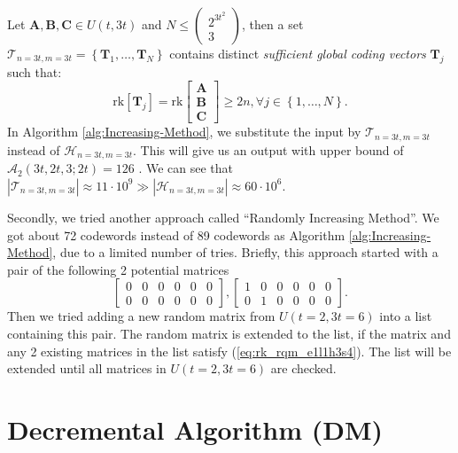 \begin{defn}
 Let $\boldsymbol{A},\boldsymbol{B},\boldsymbol{C}\in U(t,3t)$ and
$N\leq\left(\begin{array}{c}
2^{3t^{2}}\\
3
\end{array}\right)$, then a set $\mathcal{T}_{n=3t,m=3t}=\left\{ \boldsymbol{T}_{1},\ldots,\boldsymbol{T}_{N}\right\} $
contains distinct \textit{sufficient global coding vectors} $\boldsymbol{T}_{j}$
such that:
\[
\mathrm{rk}\left[\boldsymbol{T}_{j}\right]=\mathrm{rk}\left[\begin{array}{c}
\boldsymbol{A}\\
\boldsymbol{B}\\
\boldsymbol{C}
\end{array}\right]\geq2n,\forall j\in\left\{ 1,\ldots,N\right\} .
\]
In Algorithm \ref{alg:Increasing-Method}, we substitute the input
by $\mathcal{T}_{n=3t,m=3t}$ instead of $\mathcal{H}_{n=3t,m=3t}$.
This will give us an output with upper bound of $\mathcal{A}_{2}\left(3t,2t,3;2t\right)=126$
\cite[Sec. V-B]{Zhang:2019}. We can see that $\left|\mathcal{T}_{n=3t,m=3t}\right|\approx11\cdot10^{9}\gg\left|\mathcal{H}_{n=3t,m=3t}\right|\approx60\cdot10^{6}$.
\end{defn}
Secondly, we tried another approach called ``Randomly Increasing
Method''. We got about 72 codewords instead of 89 codewords as Algorithm
\ref{alg:Increasing-Method}, due to a limited number of tries. Briefly,
this approach started with a pair of the following 2 potential matrices
\[
\left[\begin{array}{cccccc}
0 & 0 & 0 & 0 & 0 & 0\\
0 & 0 & 0 & 0 & 0 & 0
\end{array}\right],\left[\begin{array}{cccccc}
1 & 0 & 0 & 0 & 0 & 0\\
0 & 1 & 0 & 0 & 0 & 0
\end{array}\right].
\]
Then we tried adding a new random matrix from $U\left(t=2,3t=6\right)$
into a list containing this pair. The random matrix is extended to
the list, if the matrix and any 2 existing matrices in the list satisfy
(\ref{eq:rk_rqm_e1l1h3s4}). The list will be extended until all matrices
in $U\left(t=2,3t=6\right)$ are checked.

\section{Decremental Algorithm (DM) \label{sec:Alternative-Approaches}}

